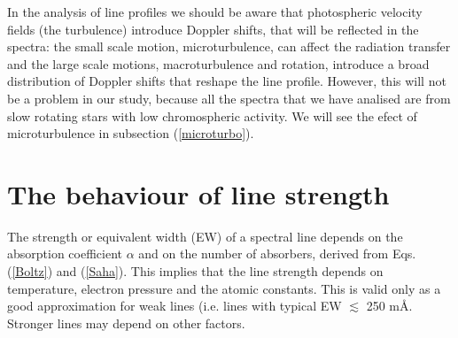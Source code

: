 \documentclass[dvips,12pt,a4paper]{report}
\begin{document}
{%








In the analysis of line profiles we should be aware that photospheric velocity fields (the turbulence) introduce Doppler shifts, that will be reflected in the spectra: the small scale motion, microturbulence, can affect the radiation transfer and the large scale motions, macroturbulence and rotation, introduce a broad distribution of Doppler shifts that reshape the line profile. However, this will not be a problem in our study, because all the spectra that we have analised are from slow rotating stars with low chromospheric activity. We will see the efect of microturbulence in subsection (\ref{microturbo}).






\section{The behaviour of line strength}
\label{linestr}
The strength or equivalent width (EW) of a spectral line depends on the absorption coefficient $\alpha$ and on the number of absorbers, derived from Eqs. (\ref{Boltz}) and (\ref{Saha}). This implies that the line strength depends on temperature, electron pressure and the atomic constants. This is valid only as a good approximation for weak lines (i.e. lines with typical EW $\lesssim$ 250 m\AA. Stronger lines may depend on other factors. 

}
\end{document}
